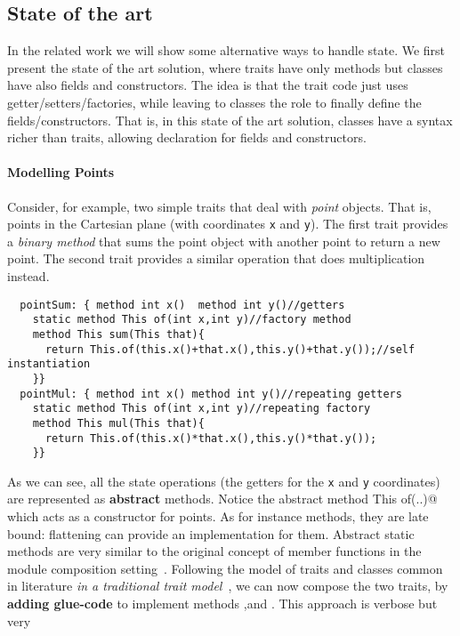 \subsection{State of the art}
In the related work we will show some alternative ways to handle
state.
We first present the state of the art solution, where 
traits have only methods but classes have also fields and constructors.
The idea is that the trait code just uses getter/setters/factories, while leaving
to classes the role to finally define the fields/constructors. That
is, in this state of the art solution, classes have a syntax richer than traits, allowing
declaration for fields and constructors. 

\paragraph{Modelling Points} Consider, for example, two simple 
traits that deal with \emph{point} objects. That is, points
in the Cartesian plane (with coordinates \lstinline{x} and
\lstinline{y}). The first trait provides a \emph{binary method} that 
sums the point object with another point to return a new point. 
The second trait provides a similar operation that does multiplication 
instead.
\saveSpace 
\begin{lstlisting}
  pointSum: { method int x()  method int y()//getters
    static method This of(int x,int y)//factory method
    method This sum(This that){
      return This.of(this.x()+that.x(),this.y()+that.y());//self instantiation
    }}
  pointMul: { method int x() method int y()//repeating getters
    static method This of(int x,int y)//repeating factory
    method This mul(This that){
      return This.of(this.x()*that.x(),this.y()*that.y());
    }}
\end{lstlisting}
\saveSpace
\noindent As we can see, all the state operations (the getters for the 
\lstinline{x} and \lstinline{y} coordinates) are represented as {\bf abstract} methods.
Notice the abstract \Q@static method This of(..)@ which acts as a constructor
for points. 
As for instance methods, they are late bound:  flattening can provide an implementation for them.
Abstract static methods are very similar to the original concept of member functions in the module composition setting~\cite{ancona2002calculus}.
Following the model of traits and classes common in literature \emph{in a traditional trait model}~\cite{ducasse2006traits},
we can now compose the two traits, by \textbf{adding glue-code}
to implement methods \Q@x@,\Q@y@ and \Q@of@.
This approach is verbose but very
